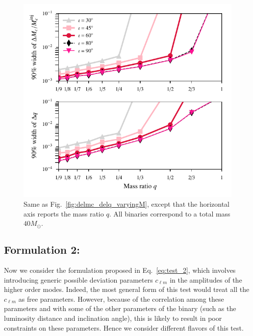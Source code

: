\documentclass[prd,preprintnumbers,twocolumn,eqsecnum,floatfix,a4paper,nofootinbib,superscriptaddress]{revtex4}
\begin{document}
 \begin{figure}[tbh]
 	\begin{center}
 		\includegraphics[scale=0.8]{figs/hm_9dim_dmcbymcinj_dq_diff_q.pdf}
 	\end{center} 
 	\caption{Same as Fig.~\ref{fig:delmc_delq_varyingM}, except that the horizontal axis reports the mass ratio $q$. All binaries correspond to a total mass $40M_{\odot}$.}
 	\label{fig:delmc_delq_varyingq}
 \end{figure}

\subsection{Formulation 2:}

Now we consider the formulation proposed in Eq.~\eqref{eq:test_2}, which involves introducing generic possible deviation parameters $c_{\ell m}$ in the amplitudes of the higher order modes. Indeed, the most general form of this test would treat all the $c_{\ell m}$ as free parameters. However, because of the correlation among these parameters and with some of the other parameters of the binary (such as the luminosity distance and inclination angle), this is likely to result in poor constraints on these parameters. Hence we consider different flavors of this test. 
\end{document}

